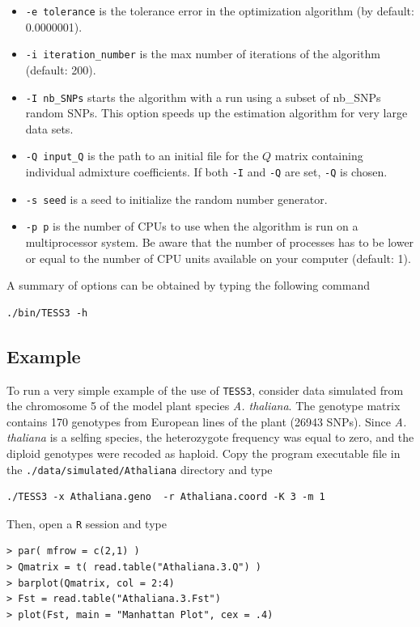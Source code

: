\documentclass[10pt,a4paper]{article}
\begin{document}
\begin{itemize}
\item \verb|-e tolerance| is the tolerance error in the optimization algorithm (by default: 0.0000001). 
\item \verb|-i iteration_number| is the max number of iterations of the algorithm (default: 200). 
\item \verb|-I nb_SNPs| starts the algorithm with a run using a subset of nb\_SNPs random SNPs. This option speeds up the estimation algorithm for very large data sets.
\item \verb|-Q input_Q| is the path to an initial file for the $Q$ matrix containing individual admixture coefficients. If both \verb|-I| and \verb|-Q| are set, \verb|-Q| is chosen.
\item \verb|-s seed| is a seed to initialize the random number generator. 
\item \verb|-p p| is the number of CPUs to use when the algorithm is run on a multiprocessor system.
Be aware that the number of processes has to be lower or equal to the number of CPU units available on your computer (default: 1).

\end{itemize}


\noindent A summary of options can be obtained  by typing the following command
\footnotesize
\begin{Verbatim}[frame=single]
./bin/TESS3 -h
\end{Verbatim}
\noindent
\normalsize


\subsection{Example}

To run a very simple example of the use of {\tt TESS3}, consider data simulated from the chromosome 5 of the model plant species {\it A. thaliana}. The genotype matrix contains 170 genotypes from European lines of the plant (26943 SNPs). Since {\it A. thaliana} is a selfing species, the heterozygote frequency was equal to zero, and the diploid genotypes were recoded as haploid. Copy the program executable file in the {\tt ./data/simulated/Athaliana} directory and type

\begin{Verbatim}[frame=single]
./TESS3 -x Athaliana.geno  -r Athaliana.coord -K 3 -m 1
\end{Verbatim}

\noindent Then, open a {\tt R} session and type


\begin{Verbatim}[frame=single]
> par( mfrow = c(2,1) )
> Qmatrix = t( read.table("Athaliana.3.Q") )
> barplot(Qmatrix, col = 2:4)
> Fst = read.table("Athaliana.3.Fst")
> plot(Fst, main = "Manhattan Plot", cex = .4)
\end{Verbatim}
\end{document}

